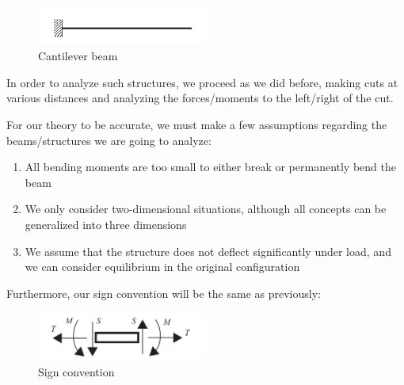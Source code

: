 \documentclass{article}
\begin{document}
\begin{figure}[h]
    \centering
    \includegraphics[width = 0.5\textwidth]{images/cantilever.png}
    \caption{Cantilever beam}
    \label{fig:enter-label}
\end{figure}

In order to analyze such structures, we proceed as we did before, making cuts at various distances and analyzing the forces/moments to the left/right of the cut.

\begin{proposition}[Hypotheses]
    For our theory to be accurate, we must make a few assumptions regarding the beams/structures we are going to analyze:
    \begin{enumerate}
        \item All bending moments are too small to either break or permanently bend the beam
        \item We only consider two-dimensional situations, although all concepts can be generalized into three dimensions
        \item We assume that the structure does not deflect significantly under load, and we can consider equilibrium in the original configuration
    \end{enumerate}
\end{proposition}

Furthermore, our sign convention will be the same as previously:

\begin{figure}[h]
    \centering
    \includegraphics[width = 0.5\textwidth]{images/signconvention.png}
    \caption{Sign convention}
    \label{fig:enter-label}
\end{figure}
\end{document}
